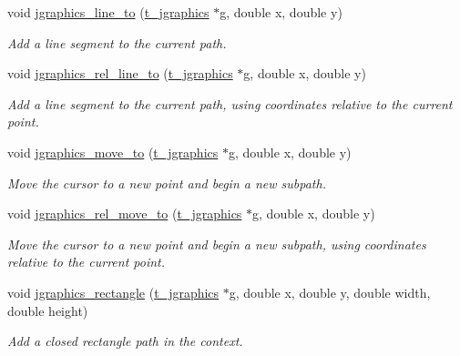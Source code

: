 \begin{DoxyCompactItemize}
void \hyperlink{group__jgraphics_ga70ce27489e0449ec8872253373459bad}{jgraphics\_\-line\_\-to} (\hyperlink{group__jgraphics_ga4bf27bd7e21a59a427481b909d4656e7}{t\_\-jgraphics} $\ast$g, double x, double y)
\begin{DoxyCompactList}\small\item\em Add a line segment to the current path. \item\end{DoxyCompactList}\item 
void \hyperlink{group__jgraphics_ga0669af2caff03efea7fab31484ad62eb}{jgraphics\_\-rel\_\-line\_\-to} (\hyperlink{group__jgraphics_ga4bf27bd7e21a59a427481b909d4656e7}{t\_\-jgraphics} $\ast$g, double x, double y)
\begin{DoxyCompactList}\small\item\em Add a line segment to the current path, using coordinates relative to the current point. \item\end{DoxyCompactList}\item 
void \hyperlink{group__jgraphics_ga52651cc3a7f9b395461eadffe9e6156b}{jgraphics\_\-move\_\-to} (\hyperlink{group__jgraphics_ga4bf27bd7e21a59a427481b909d4656e7}{t\_\-jgraphics} $\ast$g, double x, double y)
\begin{DoxyCompactList}\small\item\em Move the cursor to a new point and begin a new subpath. \item\end{DoxyCompactList}\item 
void \hyperlink{group__jgraphics_ga1d3d4ea2e22dcb02098f1f24ff937296}{jgraphics\_\-rel\_\-move\_\-to} (\hyperlink{group__jgraphics_ga4bf27bd7e21a59a427481b909d4656e7}{t\_\-jgraphics} $\ast$g, double x, double y)
\begin{DoxyCompactList}\small\item\em Move the cursor to a new point and begin a new subpath, using coordinates relative to the current point. \item\end{DoxyCompactList}\item 
void \hyperlink{group__jgraphics_ga01f63358f24616678d69721d7d505e74}{jgraphics\_\-rectangle} (\hyperlink{group__jgraphics_ga4bf27bd7e21a59a427481b909d4656e7}{t\_\-jgraphics} $\ast$g, double x, double y, double width, double height)
\begin{DoxyCompactList}\small\item\em Add a closed rectangle path in the context. \item\end{DoxyCompactList}\item 

\end{DoxyCompactItemize}
